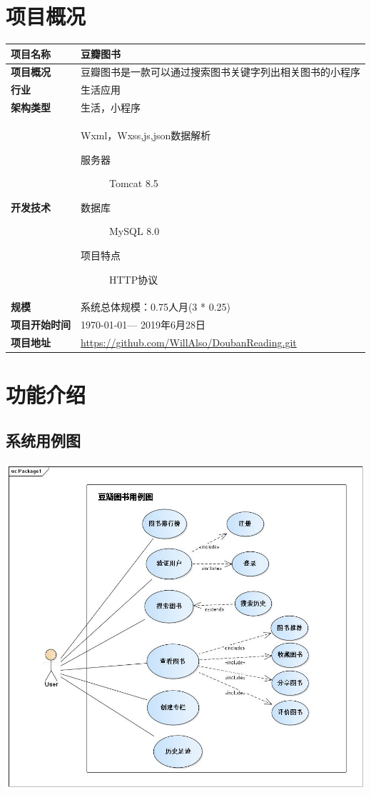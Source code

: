 \documentclass[a4paper,12pt]{ctexrep}
\begin{document}
	\section{项目概况}
	\begin{center}
		\begin{tabular}{|p{3cm}<{\centering}|p{12cm}|}
			\hline
			\textbf{项目名称}&豆瓣图书\\
			\hline
			\textbf{项目概况}&豆瓣图书是一款可以通过搜索图书关键字列出相关图书的小程序\\
			\hline
			\textbf{行业}&生活应用\\
			\hline
			\textbf{架构类型}&生活，小程序\\
			\hline
			\textbf{开发技术}&Wxml，Wxss,js,json数据解析\begin{description}
				\item[服务器] Tomcat 8.5
				\item [数据库] MySQL 8.0
				\item  [项目特点]HTTP协议
			\end{description}\\
			\hline
			\textbf{规模}&系统总体规模：0.75人月(3 * 0.25)\\
			\hline
			\textbf{项目开始时间}&\today --- 2019年6月28日\\
			\hline
			\textbf{项目地址}&\url{https://github.com/WillAlso/DoubanReading.git}\\
			\hline
		\end{tabular}
	\end{center}
	\section{功能介绍}
	\subsection*{系统用例图}
	\begin{center}
		\includegraphics[width=15cm]{Package1.jpg}
	\end{center}
\end{document}
